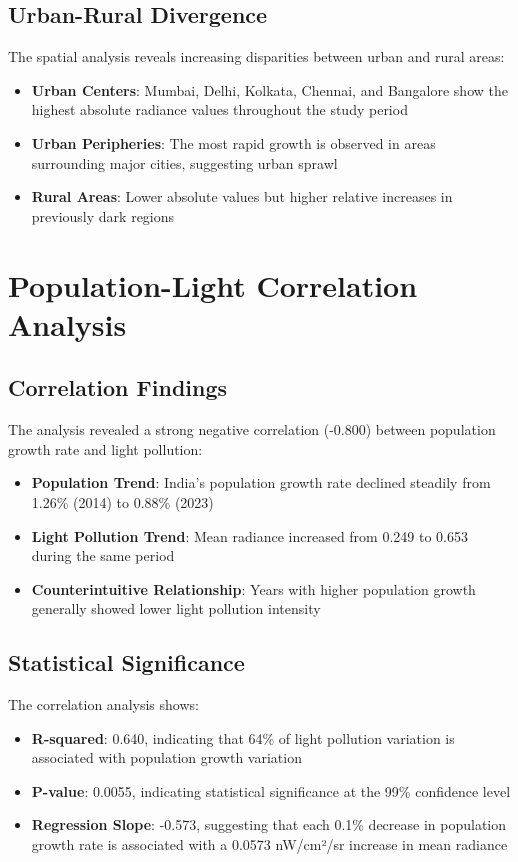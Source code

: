 \documentclass[12pt,a4paper]{article}
\begin{document}
\subsection{Urban-Rural Divergence}
The spatial analysis reveals increasing disparities between urban and rural areas:

\begin{itemize}
    \item \textbf{Urban Centers}: Mumbai, Delhi, Kolkata, Chennai, and Bangalore show the highest absolute radiance values throughout the study period
    \item \textbf{Urban Peripheries}: The most rapid growth is observed in areas surrounding major cities, suggesting urban sprawl
    \item \textbf{Rural Areas}: Lower absolute values but higher relative increases in previously dark regions
\end{itemize}

\section{Population-Light Correlation Analysis}

\subsection{Correlation Findings}
The analysis revealed a strong negative correlation (-0.800) between population growth rate and light pollution:

\begin{itemize}
    \item \textbf{Population Trend}: India's population growth rate declined steadily from 1.26\% (2014) to 0.88\% (2023)
    \item \textbf{Light Pollution Trend}: Mean radiance increased from 0.249 to 0.653 during the same period
    \item \textbf{Counterintuitive Relationship}: Years with higher population growth generally showed lower light pollution intensity
\end{itemize}

\subsection{Statistical Significance}
The correlation analysis shows:

\begin{itemize}
    \item \textbf{R-squared}: 0.640, indicating that 64\% of light pollution variation is associated with population growth variation
    \item \textbf{P-value}: 0.0055, indicating statistical significance at the 99\% confidence level
    \item \textbf{Regression Slope}: -0.573, suggesting that each 0.1\% decrease in population growth rate is associated with a 0.0573 nW/cm²/sr increase in mean radiance
\end{itemize}
\end{document}
